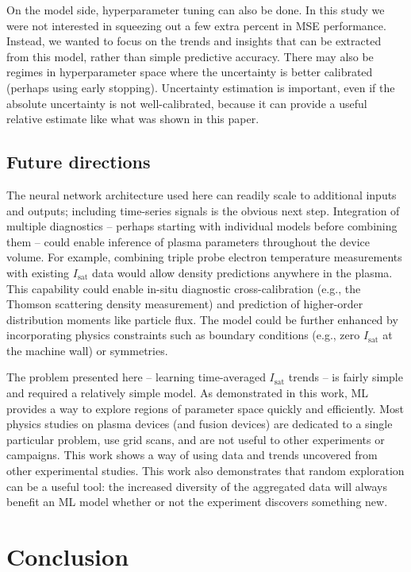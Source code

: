 On the model side, hyperparameter tuning can also be done. In this study we were not interested in squeezing out a few extra percent in MSE performance. Instead, we wanted to focus on the trends and insights that can be extracted from this model, rather than simple predictive accuracy. There may also be regimes in hyperparameter space where the uncertainty is better calibrated (perhaps using early stopping). Uncertainty estimation is important, even if the absolute uncertainty is not well-calibrated, because it can provide a useful relative estimate like what was shown in this paper. 

\subsection{Future directions}

The neural network architecture used here can readily scale to additional inputs and outputs; including time-series signals is the obvious next step. Integration of multiple diagnostics -- perhaps starting with individual models before combining them -- could enable inference of plasma parameters throughout the device volume. For example, combining triple probe electron temperature measurements with existing $I_\text{sat}$ data would allow density predictions anywhere in the plasma. This capability could enable in-situ diagnostic cross-calibration (e.g., the Thomson scattering density measurement) and prediction of higher-order distribution moments like particle flux. The model could be further enhanced by incorporating physics constraints such as boundary conditions (e.g., zero $I_\text{sat}$ at the machine wall) or symmetries. 

The problem presented here -- learning time-averaged $I_\text{sat}$ trends -- is fairly simple and required a relatively simple model. As demonstrated in this work, ML provides a way to explore regions of parameter space quickly and efficiently. Most physics studies on plasma devices (and fusion devices) are dedicated to a single particular problem, use grid scans, and are not useful to other experiments or campaigns. This work shows a way of using data and trends uncovered from other experimental studies. This work also demonstrates that random exploration can be a useful tool: the increased diversity of the aggregated data will always benefit an ML model whether or not the experiment discovers something new.

\section{Conclusion}
\label{sec:conclusion}

